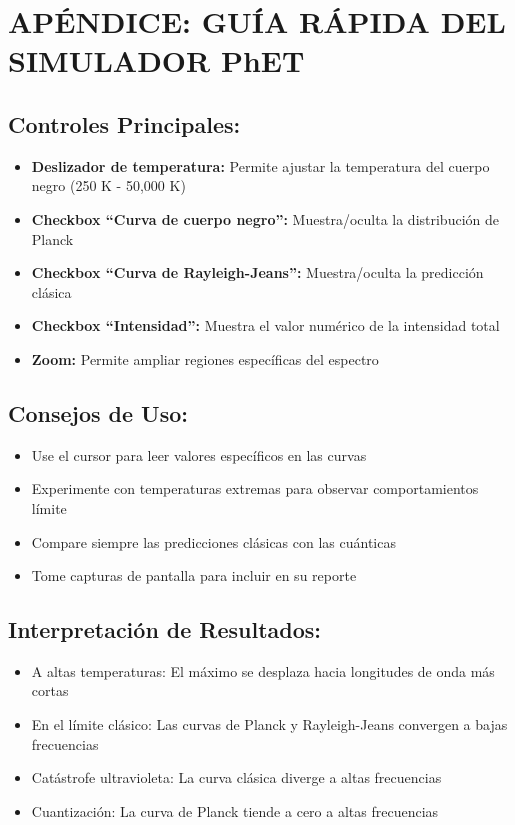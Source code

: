 \documentclass[12pt,a4paper]{article}
\begin{document}
	\section{APÉNDICE: GUÍA RÁPIDA DEL SIMULADOR PhET}
	
	\subsection{Controles Principales:}
	\begin{itemize}
		\item \textbf{Deslizador de temperatura:} Permite ajustar la temperatura del cuerpo negro (250 K - 50,000 K)
		\item \textbf{Checkbox ``Curva de cuerpo negro'':} Muestra/oculta la distribución de Planck
		\item \textbf{Checkbox ``Curva de Rayleigh-Jeans'':} Muestra/oculta la predicción clásica
		\item \textbf{Checkbox ``Intensidad'':} Muestra el valor numérico de la intensidad total
		\item \textbf{Zoom:} Permite ampliar regiones específicas del espectro
	\end{itemize}
	
	\subsection{Consejos de Uso:}
	\begin{itemize}
		\item Use el cursor para leer valores específicos en las curvas
		\item Experimente con temperaturas extremas para observar comportamientos límite
		\item Compare siempre las predicciones clásicas con las cuánticas
		\item Tome capturas de pantalla para incluir en su reporte
	\end{itemize}
	
	\subsection{Interpretación de Resultados:}
	\begin{itemize}
		\item A altas temperaturas: El máximo se desplaza hacia longitudes de onda más cortas
		\item En el límite clásico: Las curvas de Planck y Rayleigh-Jeans convergen a bajas frecuencias
		\item Catástrofe ultravioleta: La curva clásica diverge a altas frecuencias
		\item Cuantización: La curva de Planck tiende a cero a altas frecuencias
	\end{itemize}
	
\end{document}
